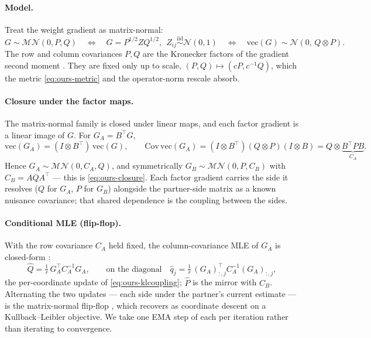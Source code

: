 \documentclass[11pt]{article}
\theoremstyle{plain}
\theoremstyle{definition}
\theoremstyle{remark}
\begin{document}
\paragraph{Model.} Treat the weight gradient as matrix-normal:
\begin{equation*}
  G\sim\mathcal{MN}(0,P,Q)
  \quad\Longleftrightarrow\quad
  G=P^{1/2}ZQ^{1/2},\ \ Z_{ij}\overset{\text{iid}}{\sim}\mathcal{N}(0,1)
  \quad\Longleftrightarrow\quad
  \mathrm{vec}(G)\sim\mathcal{N}(0,\,Q\otimes P).
\end{equation*}
The row and column covariances $P,Q$ are the Kronecker factors of the gradient second
moment \cite{soap,klshampoo}. They are fixed only up to scale,
$(P,Q)\mapsto(cP,c^{-1}Q)$, which the metric \eqref{eq:ours-metric} and the
operator-norm rescale absorb.

\paragraph{Closure under the factor maps.} The matrix-normal family is closed under
linear maps, and each factor gradient is a linear image of $G$. For $G_A=B^\top G$,
\begin{equation*}
  \mathrm{vec}(G_A)=(I\otimes B^\top)\,\mathrm{vec}(G),\qquad
  \mathrm{Cov}\,\mathrm{vec}(G_A)=(I\otimes B^\top)(Q\otimes P)(I\otimes B)
  =Q\otimes\underbrace{B^\top P B}_{C_A}.
\end{equation*}
Hence $G_A\sim\mathcal{MN}(0,C_A,Q)$, and symmetrically $G_B\sim\mathcal{MN}(0,P,C_B)$
with $C_B=AQA^\top$ --- this is \eqref{eq:ours-closure}. Each factor gradient carries
the side it resolves ($Q$ for $G_A$, $P$ for $G_B$) alongside the partner-side matrix as
a known nuisance covariance; that shared dependence is the coupling between the sides.

\paragraph{Conditional MLE (flip-flop).} With the row covariance $C_A$ held fixed, the
column-covariance MLE of $G_A$ is closed-form \cite{dutilleul}:
\begin{equation*}
  \hat Q=\tfrac1r\,G_A^\top C_A^{-1}G_A,
  \qquad\text{on the diagonal}\quad
  \hat q_j=\tfrac1r\,(G_A)_{:,j}^\top C_A^{-1}(G_A)_{:,j},
\end{equation*}
the per-coordinate update of \eqref{eq:ours-klcoupling}; $\hat P$ is the mirror with
$C_B$. Alternating the two updates --- each side under the partner's current estimate
--- is the matrix-normal flip-flop \cite{dutilleul}, which \cite{klshampoo} recovers as
coordinate descent on a Kullback--Leibler objective. We take one EMA step of each per
iteration rather than iterating to convergence.
\end{document}

